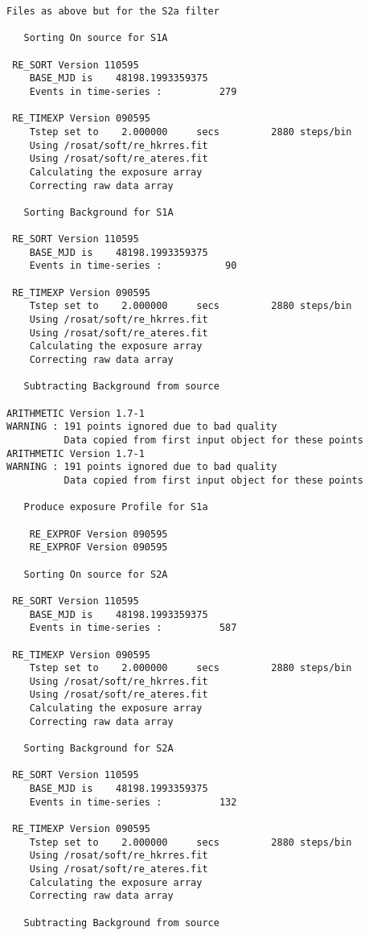 \begin{small}
\begin{verbatim}
Files as above but for the S2a filter

   Sorting On source for S1A

 RE_SORT Version 110595
    BASE_MJD is    48198.1993359375
    Events in time-series :          279

 RE_TIMEXP Version 090595
    Tstep set to    2.000000     secs         2880 steps/bin
    Using /rosat/soft/re_hkrres.fit
    Using /rosat/soft/re_ateres.fit
    Calculating the exposure array
    Correcting raw data array

   Sorting Background for S1A

 RE_SORT Version 110595
    BASE_MJD is    48198.1993359375
    Events in time-series :           90

 RE_TIMEXP Version 090595
    Tstep set to    2.000000     secs         2880 steps/bin
    Using /rosat/soft/re_hkrres.fit
    Using /rosat/soft/re_ateres.fit
    Calculating the exposure array
    Correcting raw data array

   Subtracting Background from source

ARITHMETIC Version 1.7-1
WARNING : 191 points ignored due to bad quality
          Data copied from first input object for these points
ARITHMETIC Version 1.7-1
WARNING : 191 points ignored due to bad quality
          Data copied from first input object for these points

   Produce exposure Profile for S1a

    RE_EXPROF Version 090595
    RE_EXPROF Version 090595

   Sorting On source for S2A

 RE_SORT Version 110595
    BASE_MJD is    48198.1993359375
    Events in time-series :          587

 RE_TIMEXP Version 090595
    Tstep set to    2.000000     secs         2880 steps/bin
    Using /rosat/soft/re_hkrres.fit
    Using /rosat/soft/re_ateres.fit
    Calculating the exposure array
    Correcting raw data array

   Sorting Background for S2A

 RE_SORT Version 110595
    BASE_MJD is    48198.1993359375
    Events in time-series :          132

 RE_TIMEXP Version 090595
    Tstep set to    2.000000     secs         2880 steps/bin
    Using /rosat/soft/re_hkrres.fit
    Using /rosat/soft/re_ateres.fit
    Calculating the exposure array
    Correcting raw data array

   Subtracting Background from source


\end{verbatim}
\end{small}
